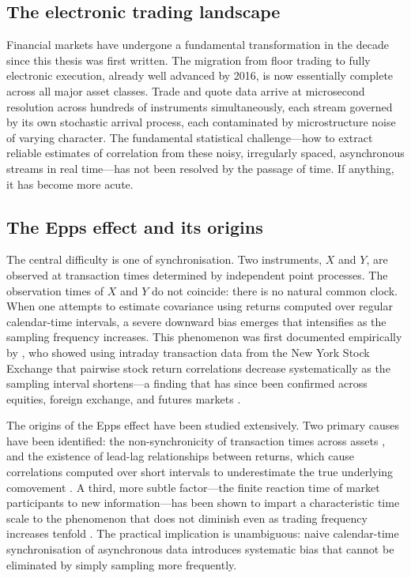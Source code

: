 \documentclass[reqno, 12pt]{amsart}
\theoremstyle{plain}
\theoremstyle{definition}
\theoremstyle{remark}
\begin{document}
\subsection{The electronic trading landscape}

Financial markets have undergone a fundamental transformation in the
decade since this thesis was first written. The migration from floor
trading to fully electronic execution, already well advanced by 2016,
is now essentially complete across all major asset classes. Trade and
quote data arrive at microsecond resolution across hundreds of
instruments simultaneously, each stream governed by its own stochastic
arrival process, each contaminated by microstructure noise of varying
character. The fundamental statistical challenge---how to extract
reliable estimates of correlation from these noisy, irregularly spaced,
asynchronous streams in real time---has not been resolved by the passage
of time. If anything, it has become more acute.

\subsection{The Epps effect and its origins}

The central difficulty is one of synchronisation. Two instruments, $X$
and $Y$, are observed at transaction times determined by independent
point processes. The observation times of $X$ and $Y$ do not coincide:
there is no natural common clock. When one attempts to estimate
covariance using returns computed over regular calendar-time intervals,
a severe downward bias emerges that intensifies as the sampling
frequency increases. This phenomenon was first documented empirically
by \citet{epps1979}, who showed using intraday transaction data from
the New York Stock Exchange that pairwise stock return correlations
decrease systematically as the sampling interval shortens---a finding
that has since been confirmed across equities, foreign exchange, and
futures markets \citep{toth2009, reno2003}.

The origins of the Epps effect have been studied extensively. Two
primary causes have been identified: the non-synchronicity of
transaction times across assets \citep{reno2003}, and the existence
of lead-lag relationships between returns, which cause correlations
computed over short intervals to underestimate the true underlying
comovement \citep{dejong1997}. A third, more subtle factor---the
finite reaction time of market participants to new information---has
been shown to impart a characteristic time scale to the phenomenon
that does not diminish even as trading frequency increases tenfold
\citep{toth2009}. The practical implication is unambiguous: naive
calendar-time synchronisation of asynchronous data introduces
systematic bias that cannot be eliminated by simply sampling more
frequently.
\end{document}

